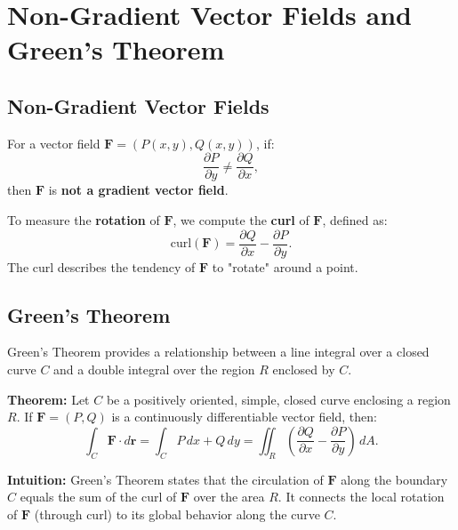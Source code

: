\documentclass{report}
\begin{document}
\section{Non-Gradient Vector Fields and Green's Theorem}

\subsection{Non-Gradient Vector Fields}
For a vector field \( \mathbf{F} = (P(x, y), Q(x, y)) \), if:
\[
\frac{\partial P}{\partial y} \neq \frac{\partial Q}{\partial x},
\]
then \( \mathbf{F} \) is \textbf{not a gradient vector field}.

To measure the \textbf{rotation} of \( \mathbf{F} \), we compute the \textbf{curl} of \( \mathbf{F} \), defined as:
\[
\text{curl}(\mathbf{F}) = \frac{\partial Q}{\partial x} - \frac{\partial P}{\partial y}.
\]
The curl describes the tendency of \( \mathbf{F} \) to "rotate" around a point.


\subsection{Green's Theorem}
Green's Theorem provides a relationship between a line integral over a closed curve \( C \) and a double integral over the region \( R \) enclosed by \( C \). 

\textbf{Theorem:}
Let \( C \) be a positively oriented, simple, closed curve enclosing a region \( R \). If \( \mathbf{F} = (P, Q) \) is a continuously differentiable vector field, then:
\[
\int_C \mathbf{F} \cdot d\mathbf{r} = \int_C P \, dx + Q \, dy = \iint_R \left( \frac{\partial Q}{\partial x} - \frac{\partial P}{\partial y} \right) \, dA.
\]

\textbf{Intuition:}
Green's Theorem states that the circulation of \( \mathbf{F} \) along the boundary \( C \) equals the sum of the curl of \( \mathbf{F} \) over the area \( R \). It connects the local rotation of \( \mathbf{F} \) (through curl) to its global behavior along the curve \( C \).
\end{document}

